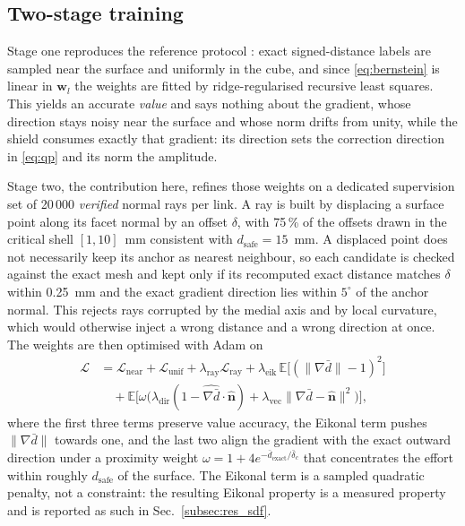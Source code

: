 \documentclass[journal]{IEEEtran}
\newcommand{\dsafe}{d_{\mathrm{safe}}}
\begin{document}
\subsection{Two-stage training}
Stage one reproduces the reference protocol \cite{Li2024rdf}: exact signed-distance labels are sampled near the surface and uniformly in the cube, and since \eqref{eq:bernstein} is linear in $\mathbf{w}_l$ the weights are fitted by ridge-regularised recursive least squares. This yields an accurate \emph{value} and says nothing about the gradient, whose direction stays noisy near the surface and whose norm drifts from unity, while the shield consumes exactly that gradient: its direction sets the correction direction in \eqref{eq:qp} and its norm the amplitude.

Stage two, the contribution here, refines those weights on a dedicated supervision set of 20\,000 \emph{verified} normal rays per link. A ray is built by displacing a surface point along its facet normal by an offset $\delta$, with 75\,\% of the offsets drawn in the critical shell $[1,10]$~mm consistent with $\dsafe=15$~mm. A displaced point does not necessarily keep its anchor as nearest neighbour, so each candidate is checked against the exact mesh and kept only if its recomputed exact distance matches $\delta$ within 0.25~mm and the exact gradient direction lies within $5^\circ$ of the anchor normal. This rejects rays corrupted by the medial axis and by local curvature, which would otherwise inject a wrong distance and a wrong direction at once. The weights are then optimised with Adam on
\begin{equation}\label{eq:refinement}
\begin{split}
\mathcal{L}&=\mathcal{L}_{\mathrm{near}}+\mathcal{L}_{\mathrm{unif}}+\lambda_{\mathrm{ray}}\mathcal{L}_{\mathrm{ray}}
+\lambda_{\mathrm{eik}}\,\mathbb{E}\big[(\|\nabla\bar d\|-1)^2\big]\\
&\quad+\mathbb{E}\Big[\omega\big(\lambda_{\mathrm{dir}}(1-\widehat{\nabla\bar d}\cdot\hat{\mathbf{n}})+\lambda_{\mathrm{vec}}\|\nabla\bar d-\hat{\mathbf{n}}\|^2\big)\Big],
\end{split}
\end{equation}
where the first three terms preserve value accuracy, the Eikonal term pushes $\|\nabla\bar d\|$ towards one, and the last two align the gradient with the exact outward direction under a proximity weight $\omega=1+4e^{-\bar d_{\mathrm{exact}}/\bar\delta_c}$ that concentrates the effort within roughly $\dsafe$ of the surface. The Eikonal term is a sampled quadratic penalty, not a constraint: the resulting Eikonal property is a measured property and is reported as such in Sec.~\ref{subsec:res_sdf}.
\end{document}
